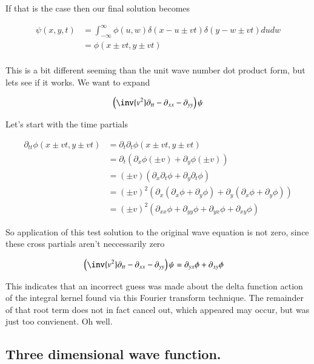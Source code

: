 \documentclass{article}
\newcommand{\IIinf}[0]{ \int_{-\infty}^\infty }
\begin{document}
If that is the case then our final solution becomes

\begin{align*}
\psi(x,y,t) 
&= \IIinf \phi(u,w) \delta( x -u \pm vt ) \delta( y -w \pm vt ) du dw \\
&= \phi( x \pm vt, y \pm vt ) \\
\end{align*}

This is a bit different seeming than the unit wave number dot product form, but lets see if it works.  We want to expand

\begin{align*}
\left(\inv{v^2} \partial_{tt} -\partial_{xx} -\partial_{yy} \right)\psi
\end{align*}

Let's start with the time partials

\begin{align*}
\partial_{tt} \phi( x \pm vt, y \pm vt ) 
&=
\partial_{t} \partial_t \phi( x \pm vt, y \pm vt ) \\
&= \partial_{t} ( \partial_x \phi (\pm v) +\partial_y \phi (\pm v) ) \\
&= (\pm v)( \partial_{x} \partial_t \phi  + \partial_y \partial_t \phi ) \\
&= (\pm v)^2( \partial_{x} (\partial_x \phi + \partial_y \phi)  + \partial_y (\partial_x \phi + \partial_y \phi)) \\
&= (\pm v)^2( \partial_{xx} \phi +\partial_{yy} \phi +\partial_{yx} \phi +\partial_{xy} \phi )
\end{align*}

So application of this test solution to the original wave equation is not zero, since these cross partials aren't neccessarily zero

\begin{align*}
\left(\inv{v^2} \partial_{tt} -\partial_{xx} -\partial_{yy} \right)\psi 
&= \partial_{yx} \phi + \partial_{xy} \phi 
\end{align*}

This indicates that an incorrect guess was made about the delta function action of the integral kernel found 
via this Fourier transform technique.  The remainder of that root term does not in fact cancel out, which appeared may 
occur, but was just too convienent.  Oh well.

\subsection{ Three dimensional wave function. }
\end{document}
